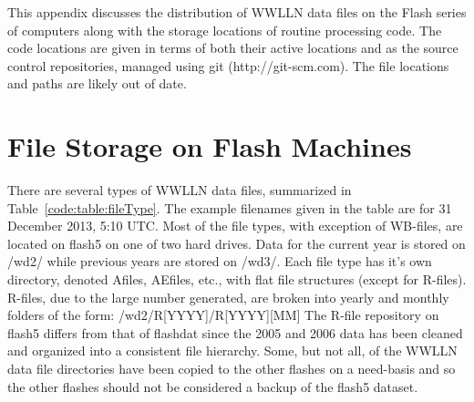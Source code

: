 This appendix discusses the distribution of WWLLN data files on the Flash series of computers along with the storage locations of routine processing code.
The code locations are given in terms of both their active locations and as the source control repositories, managed using git (http://git-scm.com).
The file locations and paths are likely out of date.

\section{File Storage on Flash Machines}

There are several types of WWLLN data files, summarized in Table~\ref{code:table:fileType}.
The example filenames given in the table are for 31 December 2013, 5:10 UTC.
Most of the file types, with exception of WB-files, are located on flash5 on one of two hard drives.
Data for the current year is stored on /wd2/ while previous years are stored on /wd3/.
Each file type has it's own directory, denoted Afiles, AEfiles, etc., with flat file structures (except for R-files).
R-files, due to the large number generated, are broken into yearly and monthly folders of the form: /wd2/R[YYYY]/R[YYYY][MM]
The R-file repository on flash5 differs from that of flashdat since the 2005 and 2006 data has been cleaned and organized into a consistent file hierarchy.
Some, but not all, of the WWLLN data file directories have been copied to the other flashes on a need-basis and so the other flashes should not be considered a backup of the flash5 dataset.

